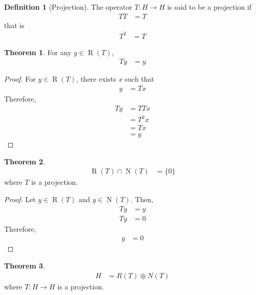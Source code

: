 \documentclass[titlepage, fleqn, a4paper, 12pt, twoside]{article}
\theoremstyle{definition}
\newtheorem{definition}{Definition}
\theoremstyle{theorem}
\newtheorem{theorem}{Theorem}
\DeclareMathOperator{\nullspace}{\mathrm{N}}
\DeclareMathOperator{\range}{\mathrm{R}}
\begin{document}
\begin{definition}[Projection]
	The operator $T : H \to H$ is said to be a projection if
	\begin{align*}
		T T &= T
	\end{align*}
	that is
	\begin{align*}
		T^2 &= T
	\end{align*}
\end{definition}

\begin{theorem}
	For any $y \in \range(T)$,
	\begin{align*}
		T y &= y
	\end{align*}
\end{theorem}

\begin{proof}
	For $y \in \range(T)$, there exists $x$ such that
	\begin{align*}
		y &= T x
	\end{align*}
	Therefore,
	\begin{align*}
		T y &= T T x\\
		&= T^2 x\\
		&= T x\\
		&= y
	\end{align*}
\end{proof}

\begin{theorem}
	\begin{align*}
		\range(T) \cap \nullspace(T) &= \{0\}
	\end{align*}
	where $T$ is a projection.
\end{theorem}

\begin{proof}
	Let $y \in \range(T)$ and $y \in \nullspace(T)$.
	Then,
	\begin{align*}
		T y &= y\\
		T y &= 0
	\end{align*}
	Therefore,
	\begin{align*}
		y &= 0
	\end{align*}
\end{proof}

\begin{theorem}
	\begin{align*}
		H &= R(T) \oplus N(T)
	\end{align*}
	where $T : H \to H$ is a projection.
\end{theorem}
\end{document}
